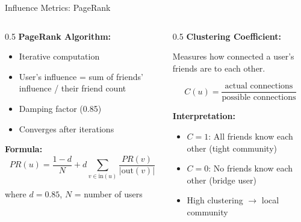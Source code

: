 \documentclass[aspectratio=169,xcolor=dvipsnames]{beamer}
\begin{document}
\begin{frame}{Influence Metrics: PageRank}
  \begin{columns}
    \begin{column}{0.5\textwidth}
      \textbf{PageRank Algorithm:}
      \begin{itemize}
        \item Iterative computation
        \item User's influence = sum of friends' influence / their friend count
        \item Damping factor (0.85)
        \item Converges after iterations
      \end{itemize}

      \vspace{0.3cm}
      \textbf{Formula:}
      \[
      PR(u) = \frac{1-d}{N} + d \sum_{v \in \text{in}(u)} \frac{PR(v)}{|\text{out}(v)|}
      \]

      \small where $d=0.85$, $N$ = number of users
    \end{column}

    \begin{column}{0.5\textwidth}
      \textbf{Clustering Coefficient:}

      Measures how connected a user's friends are to each other.

      \[
      C(u) = \frac{\text{actual connections}}{\text{possible connections}}
      \]

      \vspace{0.3cm}
      \textbf{Interpretation:}
      \begin{itemize}
        \item $C = 1$: All friends know each other (tight community)
        \item $C = 0$: No friends know each other (bridge user)
        \item High clustering $\to$ local community
      \end{itemize}
    \end{column}
  \end{columns}
\end{frame}
\end{document}

